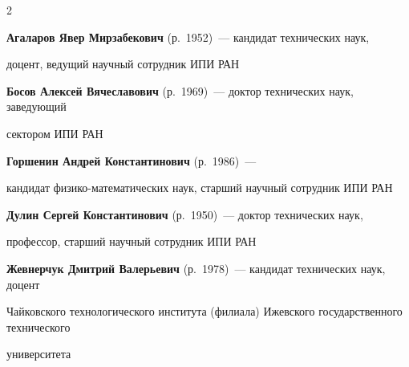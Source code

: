 \begin{multicols}{2}






\noindent

\textbf{Агаларов Явер Мирзабекович} (р.\ 1952)~---  кандидат технических наук,

доцент, ведущий научный сотрудник ИПИ РАН



\vspace*{5pt}





\noindent

\textbf{Босов Алексей Вячеславович} (р.\ 1969)~--- доктор технических наук, заведующий

сектором ИПИ РАН



\vspace*{5pt}



\noindent

\textbf{Горшенин Андрей Константинович} (р.\ 1986)~--- 

кандидат фи\-зи\-ко-математических  наук, старший научный сотрудник  ИПИ РАН



\vspace*{5pt}



\noindent

\textbf{Дулин Сергей Константинович} (р.\ 1950)~--- доктор технических наук, 

профессор, старший научный сотрудник ИПИ РАН



\vspace*{5pt}



\noindent

\textbf{Жевнерчук Дмитрий Валерьевич} (р.\ 1978)~--- кандидат технических наук, доцент 

Чайковского технологического института (филиала) Ижевского государственного технического 

университета



\vspace*{5pt}



\noindent


\end{multicols}

